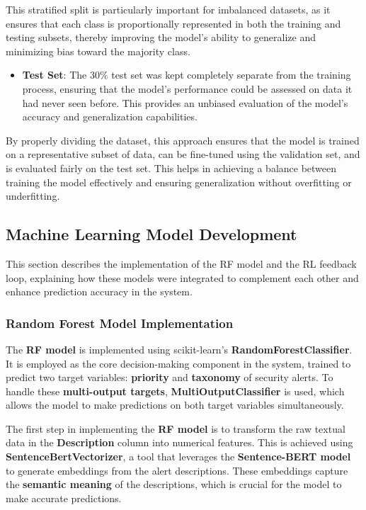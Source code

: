 This stratified split is particularly important for imbalanced datasets, as it ensures that each class is proportionally represented in both the training and testing subsets, thereby improving the model's ability to generalize and minimizing bias toward the majority class.

\begin{itemize}
    \item \textbf{Test Set}: The 30\% test set was kept completely separate from the training process, ensuring that the model's performance could be assessed on data it had never seen before. This provides an unbiased evaluation of the model's accuracy and generalization capabilities.
\end{itemize}

By properly dividing the dataset, this approach ensures that the model is trained on a representative subset of data, can be fine-tuned using the validation set, and is evaluated fairly on the test set. 
This helps in achieving a balance between training the model effectively and ensuring generalization without overfitting or underfitting.

\subsection{Machine Learning Model Development}
This section describes the implementation of the RF model and the RL feedback loop, explaining how these models were integrated to complement each other and enhance prediction accuracy in the system.

\subsubsection{Random Forest Model Implementation}

The \textbf{RF model} is implemented using scikit-learn's \textbf{RandomForestClassifier}. 
It is employed as the core decision-making component in the system, trained to predict two target variables: \textbf{priority} and \textbf{taxonomy} of security alerts. 
To handle these \textbf{multi-output targets}, \textbf{MultiOutputClassifier} is used, which allows the model to make predictions on both target variables simultaneously.

The first step in implementing the \textbf{RF model} is to transform the raw textual data in the \textbf{Description} column into numerical features. 
This is achieved using \textbf{SentenceBertVectorizer}, a tool that leverages the \textbf{Sentence-BERT model} to generate embeddings from the alert descriptions. 
These embeddings capture the \textbf{semantic meaning} of the descriptions, which is crucial for the model to make accurate predictions.

